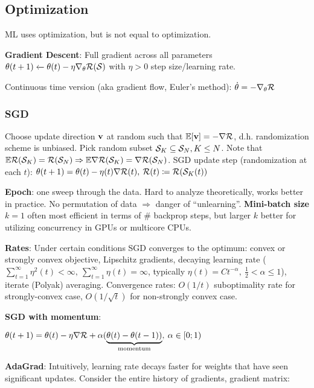 \subsection{Optimization}
\label{sub:optimization}
    ML uses optimization, but is not equal to optimization.
    
    \textbf{Gradient Descent}: Full gradient across all parameters\\
    \tab$\theta(t+1)\xleftarrow{}\theta(t)-\eta\nabla_\theta\mathcal{R}(\mathcal{S})$ with $\eta > 0$ step size/learning rate.
    
    Continuous time version (aka gradient flow, Euler's method): $\Dot{\theta}=-\nabla_\theta\mathcal{R}$
    
    \subsubsection{SGD}
    \label{ssub:sgd}
        Choose update direction $\mathbf v$ at random such that $\mathbb E\lbrack\mathbf v\rbrack=-\nabla\mathcal{R}$, d.h. randomization scheme is unbiased. Pick random subset $\mathcal{S}_K\subseteq\mathcal{S}_N, K\leq N$. Note that $\mathbb E\mathcal{R}(\mathcal{S}_K)=\mathcal{R}(\mathcal{S}_N)\Rightarrow\mathbb E\nabla\mathcal{R}(\mathcal{S}_K)=\nabla\mathcal{R}(\mathcal{S}_N)$. SGD update step (randomization at each $t$): \tab$\theta(t+1)=\theta(t)-\eta(t)\nabla\mathcal{R}(t),\>\mathcal{R}(t)\coloneqq\mathcal{R}(\mathcal{S}_K(t))$
        
        \textbf{Epoch}: one sweep through the data. Hard to analyze theoretically, works better in practice. No permutation of data $\Rightarrow$ danger of ``unlearning''.
        \textbf{Mini-batch size} $k=1$ often most efficient in terms of \# backprop steps, but larger $k$ better for utilizing concurrency in GPUs or multicore CPUs.
        
        \textbf{Rates}: Under certain conditions SGD converges to the optimum: convex or strongly convex objective, Lipschitz gradients, decaying learning rate ($\sum^\infty_{t=1}\eta^2(t)<\infty,\>\sum^\infty_{t=1}\eta(t)=\infty$, typically $\eta(t)=C t^{-\alpha},\>\frac{1}{2}<\alpha\leq1$), iterate (Polyak) averaging. Convergence rates: $O(1/t)$ suboptimality rate for strongly-convex case, $O(1/\sqrt{t})$ for non-strongly convex case.
        
        \textbf{SGD with momentum}:
        
        \tab$\theta(t+1)=\theta(t)-\eta\nabla\mathcal{R}+\alpha(\underbrace{\theta(t)-\theta(t-1))}_\text{momentum},\>\alpha\in\lbrack0;1)$
        
        \textbf{AdaGrad}: Intuitively, learning rate decays faster for weights that have seen significant updates. Consider the entire history of gradients, gradient matrix:
        
